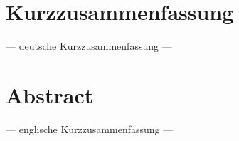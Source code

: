 \chapter*{Kurzzusammenfassung}

--- deutsche Kurzzusammenfassung ---


\chapter*{Abstract}

--- englische Kurzzusammenfassung ---

